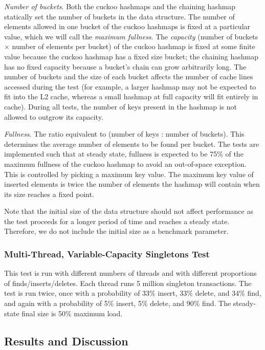 \emph{Number of buckets}. Both the cuckoo hashmaps and the chaining hashmap statically set the number of buckets in the data structure. The number of elements allowed in one bucket of the cuckoo hashmaps is fixed at a particular value, which we will call the \emph{maximum fullness}. 
        The \emph{capacity} (number of buckets $\times$ number of elements per bucket) of the cuckoo hashmap is fixed at some finite value because the cuckoo hashmap has a fixed size bucket; the chaining hashmap has no fixed capacity because a bucket's chain can grow arbitrarily long.
        The number of buckets and the size of each bucket affects the number of cache lines accessed during the test (for example, a larger hashmap may not be expected to fit into the L2 cache, whereas a small hashmap at full capacity will fit entirely in cache). During all tests, the number of keys present in the hashmap is not allowed to outgrow its capacity.
    
    \emph{Fullness}. The ratio equivalent to (number of keys : number of buckets). This determines the average number of elements to be found per bucket. The tests are implemented such that at steady state, fullness is expected to be 75\% of the maximum fullness of the cuckoo hashmap to avoid an out-of-space exception. This is controlled by picking a maximum key value. The maximum key value of inserted elements is twice the number of elements the hashmap will contain when its size reaches a fixed point.

        Note that the initial size of the data structure should not affect performance as the test proceeds for a longer period of time and reaches a steady state. Therefore, we do not include the initial size as a benchmark parameter.

\subsubsection{Multi-Thread, Variable-Capacity Singletons Test} 
This test is run with different numbers of threads and with different proportions of finds/inserts/deletes. Each thread runs 5 million singleton transactions.
The test is run twice, once with a probability of 33\% insert, 33\% delete, and 34\% find, and again with a probability of 5\% insert, 5\% delete, and 90\% find. The steady-state final size is 50\% maximum load.

\subsection{Results and Discussion}


